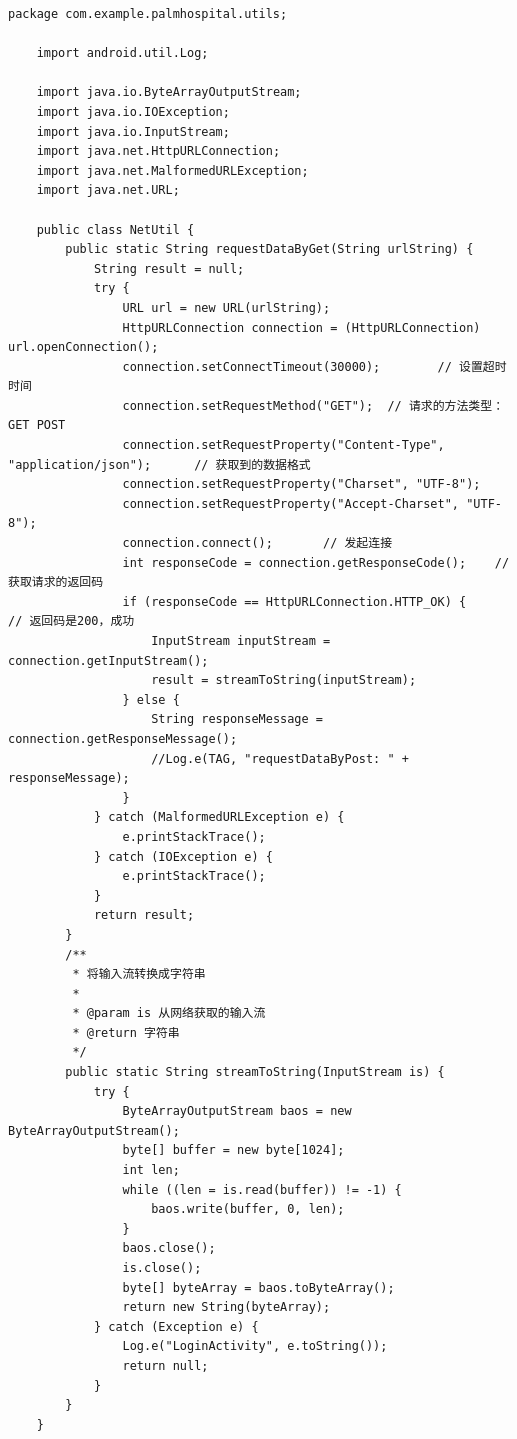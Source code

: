 \documentclass[UTF8,12pt]{article}
\begin{document}
\begin{lstlisting}[frame=shadowbox]
    package com.example.palmhospital.utils;

    import android.util.Log;

    import java.io.ByteArrayOutputStream;
    import java.io.IOException;
    import java.io.InputStream;
    import java.net.HttpURLConnection;
    import java.net.MalformedURLException;
    import java.net.URL;
    
    public class NetUtil {
        public static String requestDataByGet(String urlString) {
            String result = null;
            try {
                URL url = new URL(urlString);
                HttpURLConnection connection = (HttpURLConnection) url.openConnection();
                connection.setConnectTimeout(30000);        // 设置超时时间
                connection.setRequestMethod("GET");  // 请求的方法类型：GET POST
                connection.setRequestProperty("Content-Type", "application/json");      // 获取到的数据格式
                connection.setRequestProperty("Charset", "UTF-8");
                connection.setRequestProperty("Accept-Charset", "UTF-8");
                connection.connect();       // 发起连接
                int responseCode = connection.getResponseCode();    // 获取请求的返回码
                if (responseCode == HttpURLConnection.HTTP_OK) {        // 返回码是200，成功
                    InputStream inputStream = connection.getInputStream();
                    result = streamToString(inputStream);
                } else {
                    String responseMessage = connection.getResponseMessage();
                    //Log.e(TAG, "requestDataByPost: " + responseMessage);
                }
            } catch (MalformedURLException e) {
                e.printStackTrace();
            } catch (IOException e) {
                e.printStackTrace();
            }
            return result;
        }
        /**
         * 将输入流转换成字符串
         *
         * @param is 从网络获取的输入流
         * @return 字符串
         */
        public static String streamToString(InputStream is) {
            try {
                ByteArrayOutputStream baos = new ByteArrayOutputStream();
                byte[] buffer = new byte[1024];
                int len;
                while ((len = is.read(buffer)) != -1) {
                    baos.write(buffer, 0, len);
                }
                baos.close();
                is.close();
                byte[] byteArray = baos.toByteArray();
                return new String(byteArray);
            } catch (Exception e) {
                Log.e("LoginActivity", e.toString());
                return null;
            }
        }
    }    
\end{lstlisting}
\end{document}

